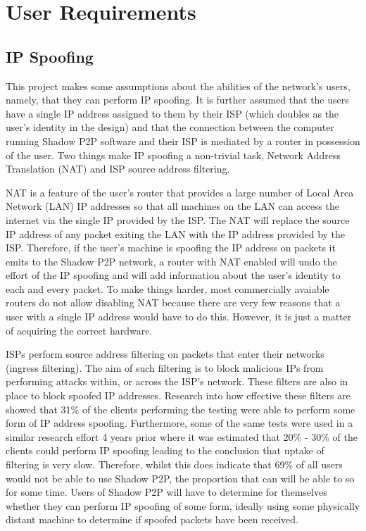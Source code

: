 \documentclass[ %
                    author={Luke Murray},
                supervisor={Dr. Simon Hollis},
                     title={Shadow Peer-to-Peer Networks},
                  subtitle={},
                    degree={MEng},
                      year={2013} ]{thesis}
\begin{document}
\section{User Requirements}
\subsection{IP Spoofing}

This project makes some assumptions about the abilities of the network's users, namely, that they can perform IP spoofing. It is further assumed that the users have a single IP address assigned to them by their ISP (which doubles as the user's identity in the design) and that the connection between the computer running Shadow P2P software and their ISP is mediated by a router in possession of the user. Two things make IP spoofing a non-trivial task, Network Address Translation (NAT) and ISP source address filtering.

NAT is a feature of the user's router that provides a large number of Local Area Network (LAN) IP addresses so that all machines on the LAN can access the internet via the single IP provided by the ISP. The NAT will replace the source IP address of any packet exiting the LAN with the IP address provided by the ISP. Therefore, if the user's machine is spoofing the IP address on packets it emits to the Shadow P2P network, a router with NAT enabled will undo the effort of the IP spoofing and will add information about the user's identity to each and every packet. To make things harder, most commercially avaiable routers do not allow disabling NAT because there are very few reasons that a user with a single IP address would have to do this. However, it is just a matter of acquiring the correct hardware.

ISPs perform source address filtering on packets that enter their networks (ingress filtering). The aim of such filtering is to block malicious IPs from performing attacks within, or across the ISP's network. These filters are also in place to block spoofed IP addresses. Research into how effective these filters are showed that 31\% of the clients performing the testing were able to perform some form of IP address spoofing\cite{beverly2009understanding}. Furthermore, some of the same tests were used in a similar research effort 4 years prior\cite{bb-spoofer-sruti} where it was estimated that 20\% - 30\% of the clients could perform IP spoofing leading to the conclusion that uptake of filtering is very slow. Therefore, whilst this does indicate that 69\% of all users would not be able to use Shadow P2P, the proportion that can will be able to so for some time. Users of Shadow P2P will have to determine for themselves whether they can perform IP spoofing of some form, ideally using some physically distant machine to determine if spoofed packets have been received.
\end{document}
